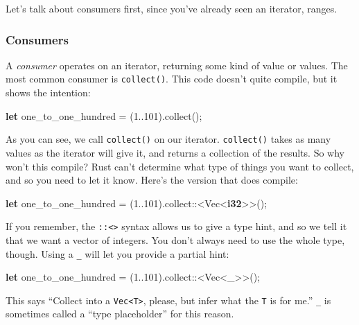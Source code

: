 \documentclass[a4paper,]{book}
\newenvironment{Shaded}{\begin{snugshade}}{\end{snugshade}}
\newcommand{\KeywordTok}[1]{\textcolor[rgb]{0.13,0.29,0.53}{\textbf{{#1}}}}
\newcommand{\DecValTok}[1]{\textcolor[rgb]{0.00,0.00,0.81}{{#1}}}
\newcommand{\NormalTok}[1]{{#1}}
\begin{document}
Let's talk about consumers first, since you've already seen an iterator,
ranges.

\subsubsection{Consumers}\label{consumers}

A \emph{consumer} operates on an iterator, returning some kind of value
or values. The most common consumer is \texttt{collect()}. This code
doesn't quite compile, but it shows the intention:

\begin{Shaded}
\begin{Highlighting}[]
\KeywordTok{let} \NormalTok{one_to_one_hundred = (}\DecValTok{1.}\NormalTok{.}\DecValTok{101}\NormalTok{).collect();}
\end{Highlighting}
\end{Shaded}

As you can see, we call \texttt{collect()} on our iterator.
\texttt{collect()} takes as many values as the iterator will give it,
and returns a collection of the results. So why won't this compile? Rust
can't determine what type of things you want to collect, and so you need
to let it know. Here's the version that does compile:

\begin{Shaded}
\begin{Highlighting}[]
\KeywordTok{let} \NormalTok{one_to_one_hundred = (}\DecValTok{1.}\NormalTok{.}\DecValTok{101}\NormalTok{).collect::<Vec<}\KeywordTok{i32}\NormalTok{>>();}
\end{Highlighting}
\end{Shaded}

If you remember, the \texttt{::\textless{}\textgreater{}} syntax allows
us to give a type hint, and so we tell it that we want a vector of
integers. You don't always need to use the whole type, though. Using a
\texttt{\_} will let you provide a partial hint:

\begin{Shaded}
\begin{Highlighting}[]
\KeywordTok{let} \NormalTok{one_to_one_hundred = (}\DecValTok{1.}\NormalTok{.}\DecValTok{101}\NormalTok{).collect::<Vec<_>>();}
\end{Highlighting}
\end{Shaded}

This says ``Collect into a \texttt{Vec\textless{}T\textgreater{}},
please, but infer what the \texttt{T} is for me.'' \texttt{\_} is
sometimes called a ``type placeholder'' for this reason.
\end{document}
